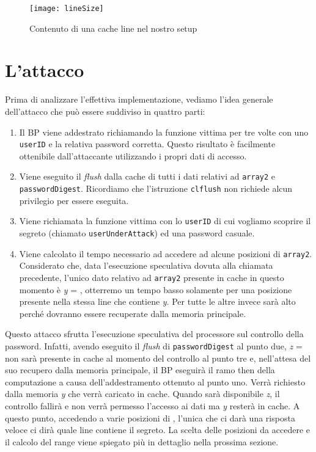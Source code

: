 		\begin{figure}
			\begin{center}
				\texttt{[image: lineSize]}
				\caption{Contenuto di una cache line nel nostro setup}
				\label{fig:lineSize}
			\end{center}
		\end{figure}
		
		\section{L'attacco}
			Prima di analizzare l'effettiva implementazione, vediamo l'idea generale dell'attacco che può essere suddiviso in quattro parti:
			
			\begin{enumerate}
				\item Il \ac{BP} viene addestrato richiamando la funzione vittima per tre volte con uno \texttt{userID} e la relativa password corretta. Questo risultato è facilmente ottenibile dall'attaccante utilizzando i propri dati di accesso.
				\item Viene eseguito il \emph{flush} dalla cache di tutti i dati relativi ad \texttt{array2} e \texttt{passwordDigest}. Ricordiamo che l'istruzione \texttt{clflush} non richiede alcun privilegio per essere eseguita.
				\item Viene richiamata la funzione vittima con lo \texttt{userID} di cui vogliamo scoprire il segreto (chiamato \texttt{userUnderAttack}) ed una password casuale.
				\item Viene calcolato il tempo necessario ad accedere ad alcune posizioni di \texttt{array2}. Considerato che, data l'esecuzione speculativa dovuta alla chiamata precedente, l'unico dato relativo ad \texttt{array2} presente in cache in questo momento è \emph{y} = , otterremo un tempo basso solamente per una posizione presente nella stessa line che contiene \emph{y}. Per tutte le altre invece sarà alto perché dovranno essere recuperate dalla memoria principale.
			\end{enumerate}
		
			Questo attacco sfrutta l'esecuzione speculativa del processore sul controllo della password. Infatti, avendo eseguito il \emph{flush} di \texttt{passwordDigest} al punto due, \emph{z} =  non sarà presente in cache al momento del controllo al punto tre e, nell'attesa del suo recupero dalla memoria principale, il \ac{BP} eseguirà il ramo then della computazione a causa dell'addestramento ottenuto al punto uno. Verrà richiesto dalla memoria \emph{y} che verrà caricato in cache. Quando sarà disponibile \emph{z}, il controllo fallirà e non verrà permesso l'accesso ai dati ma \emph{y} resterà in cache. A questo punto, accedendo a varie posizioni di , l'unica che ci darà una risposta veloce ci dirà quale line contiene il segreto. La scelta delle posizioni da accedere e il calcolo del range viene spiegato più in dettaglio nella prossima sezione.
			
